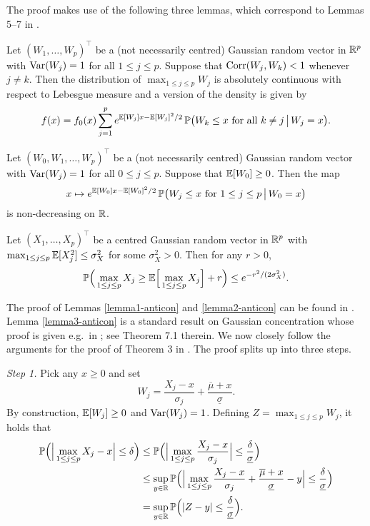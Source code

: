  
The proof makes use of the following three lemmas, which correspond to Lemmas 5--7 in \cite{Chernozhukov2015}. 
\begin{lemmaA}\label{lemma1-anticon}
Let $(W_1,\ldots,W_p)^\top$ be a (not necessarily centred) Gaussian random vector in $\mathbb{R}^p$ with $\textnormal{Var}(W_j) = 1$ for all $1 \le j \le p$. Suppose that $\textnormal{Corr}(W_j,W_k) < 1$ whenever $j \ne k$. Then the distribution of $\max_{1 \le j \le p} W_j$ is absolutely continuous with respect to Lebesgue measure and a version of the density is given by 
\[ f(x) = f_0(x) \sum\limits_{j=1}^p e^{\mathbb{E}[W_j]x - \mathbb{E}[W_j]^2/2} \, \mathbb{P} \big(W_k \le x \text{ for all } k \ne j \, \big| \, W_j = x \big). \]
\end{lemmaA}
\begin{lemmaA}\label{lemma2-anticon}
Let $(W_0,W_1,\ldots,W_p)^\top$ be a (not necessarily centred) Gaussian random vector with $\textnormal{Var}(W_j) = 1$ for all $0 \le j \le p$. Suppose that $\mathbb{E}[W_0] \ge 0$. Then the map 
\[ x \mapsto  e^{\mathbb{E}[W_0]x - \mathbb{E}[W_0]^2/2} \, \mathbb{P} \big(W_j \le x \text{ for } 1 \le j \le p \, \big| \, W_0 = x \big) \]
is non-decreasing on $\mathbb{R}$. 
\end{lemmaA}
\begin{lemmaA}\label{lemma3-anticon}
Let $(X_1,\ldots,X_p)^\top$ be a centred Gaussian random vector in $\mathbb{R}^p$ with $\max_{1 \le j \le p} \mathbb{E}[X_j^2] \le \sigma_X^2$ for some $\sigma_X^2 > 0$. Then for any $r > 0$, 
\[ \mathbb{P} \Big( \max_{1 \le j \le p} X_j \ge \mathbb{E} \Big[ \max_{1 \le j \le p} X_j \Big] + r \Big) \le e^{-r^2/(2\sigma_X^2)}. \]
\end{lemmaA} 
The proof of Lemmas \ref{lemma1-anticon} and \ref{lemma2-anticon} can be found in \cite{Chernozhukov2015}. Lemma \ref{lemma3-anticon} is a standard result on Gaussian concentration whose proof is given e.g.\ in \cite{Ledoux2001}; see Theorem 7.1 therein. We now closely follow the arguments for the proof of Theorem 3 in \cite{Chernozhukov2015}. The proof splits up into three steps. 
\vspace{7pt}


\textit{Step 1.} %
Pick any $x \ge 0$ and set 
\[ W_j = \frac{X_j - x}{\sigma_j} + \frac{\overline{\mu} + x}{\underline{\sigma}}. \]
By construction, $\mathbb{E}[W_j] \ge 0$ and $\textnormal{Var}(W_j) = 1$. Defining $Z = \max_{1 \le j \le p} W_j$, it holds that  
\begin{align*}
\mathbb{P} \Big( \Big| \max_{1 \le j \le p} X_j - x \Big| \le \delta \Big) 
 & \le \mathbb{P} \Big( \Big| \max_{1 \le j \le p} \frac{X_j - x}{\sigma_j} \Big| \le \frac{\delta}{\underline{\sigma}} \Big) \\
 & \le \sup_{y \in \mathbb{R}} \mathbb{P} \Big( \Big| \max_{1 \le j \le p} \frac{X_j - x}{\sigma_j} + \frac{\overline{\mu} + x}{\underline{\sigma}} - y \Big| \le \frac{\delta}{\underline{\sigma}} \Big) \\
 & = \sup_{y \in \mathbb{R}} \mathbb{P} \Big( |Z - y| \le \frac{\delta}{\underline{\sigma}} \Big). 
\end{align*}


